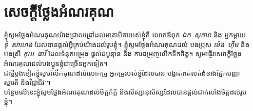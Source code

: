 \chapter*{សេចក្ដីថ្លែងអំណរគុណ}
ខ្ញុំសូមថ្លែងអំណរគុណយ៉ាងជ្រាលជ្រៅដល់មាតាបិតារបស់ខ្ញុំគឺ លោកឪពុក \emph{ឯក~សុភាព} និង អ្នកម្ដាយ \emph{ទុំ~សាហេង} ដែលបានផ្ដល់អ្វីគ្រប់យ៉ាងដល់រូបខ្ញុំ។ ខ្ញុំសូមថ្លែងអំណរគុណដល់ បងប្រុស \emph{ម៉េង~ហុីម} និង បងស្រី \emph{កុយ~ធាវី} ដែលទំនុកបម្រុង ផ្ដល់ដំបូន្មាន និង ការជម្រុញលើកទឹកចិត្ត។ សូមផ្ញើរសេចក្ដីថ្លែងអំណរគុណដល់បងប្អូនខ្ញុំជាច្រើនអ្នកទៀត។
\\[1em]
ជាថ្មីម្ដងទៀតខ្ញុំសូមរំលឹកគុណដល់លោកគ្រូ អ្នកគ្រូរបស់ខ្ញុំដែលបាន បង្ហាត់ពត់លត់ដំខាងផ្នែកបញ្ញាស្មារតី និងវិជ្ជាជីវៈ។\\ បន្ថែមលើនេះខ្ញុំសូមថ្លែងអំណរគុណដល់មិត្តភ័ក្ដិ និងសិស្សានុសិស្សដែលបានផ្ដល់ជាកំលាំងចិត្តដល់រូបខ្ញុំ។